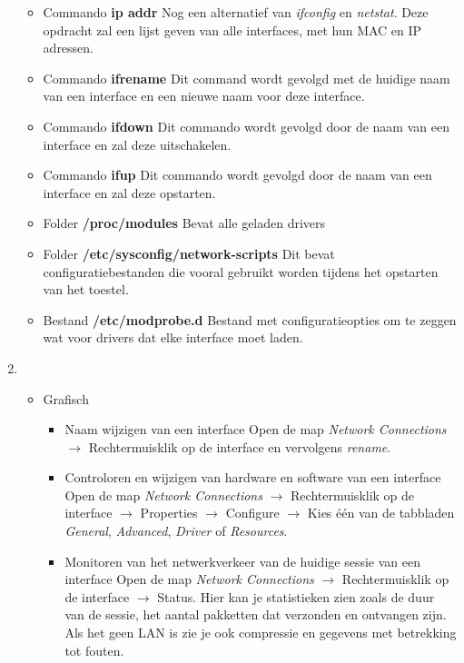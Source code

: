 \documentclass{report}
\begin{document}
\begin{enumerate}
\begin{itemize}
		\item Commando \textbf{ip addr}
		Nog een alternatief van \textit{ifconfig} en \textit{netstat}. Deze opdracht zal een lijst geven van alle interfaces, met hun MAC en IP adressen.
		\item Commando \textbf{ifrename}
		Dit command wordt gevolgd met de huidige naam van een interface en een nieuwe naam voor deze interface.
		\item Commando \textbf{ifdown}
		\newline
		Dit commando wordt gevolgd door de naam van een interface en zal deze uitschakelen.
		\item Commando \textbf{ifup}
		\newline
		Dit commando wordt gevolgd door de naam van een interface en zal deze opstarten.
		\item Folder \textbf{/proc/modules}
		\newline
		Bevat alle geladen drivers
		\item Folder \textbf{/etc/sysconfig/network-scripts}
		\newline
		Dit bevat configuratiebestanden die vooral gebruikt worden tijdens het opstarten van het toestel.
		\item Bestand \textbf{/etc/modprobe.d}
		\newline
		Bestand met configuratieopties om te zeggen wat voor drivers dat elke interface moet laden.
	\end{itemize}
	\item %
	\begin{itemize}
		\item Grafisch
			\begin{itemize}
				\item Naam wijzigen van een interface
				\newline
				Open de map \textit{Network Connections} $\rightarrow$ Rechtermuisklik op de interface en vervolgens \textit{rename}.
				\item Controloren en wijzigen van hardware en software van een interface
				\newline
				Open de map \textit{Network Connections} $\rightarrow$ Rechtermuisklik op de interface $\rightarrow$ Properties $\rightarrow$ Configure $\rightarrow$ Kies één van de tabbladen \textit{General}, \textit{Advanced}, \textit{Driver} of \textit{Resources}.
				\item Monitoren van het netwerkverkeer van de huidige sessie van een interface
				\newline
				Open de map \textit{Network Connections} $\rightarrow$ Rechtermuisklik op de interface $\rightarrow$ Status. Hier kan je statistieken zien zoals de duur van de sessie, het aantal pakketten dat verzonden en ontvangen zijn. Als het geen LAN is zie je ook compressie en gegevens met betrekking tot fouten.

\end{itemize}
\end{itemize}
\end{enumerate}
\end{document}
